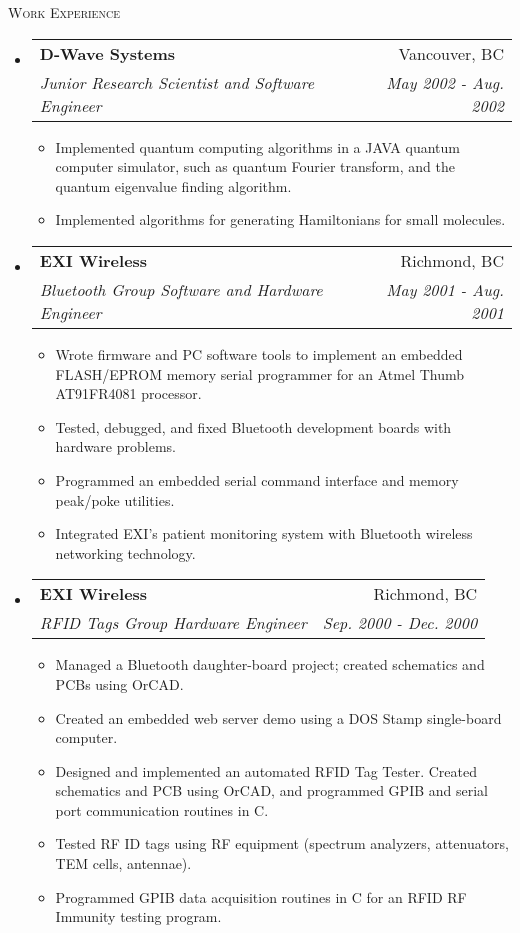 \documentclass[letterpaper,11pt]{article}
\makeatletter
\newcommand{\resitem}[1]{\item #1 \vspace{-2pt}}
\newcommand{\ressubheading}[4]{
\begin{tabular*}{6.5in}{l@{\extracolsep{\fill}}r}
		\textbf{#1} & #2 \\
		\textit{#3} & \textit{#4} \\
\end{tabular*}\vspace{-6pt}}
\makeatother
\begin{document}
\begin{tcolorbox}
\textsc{Work Experience}
\end{tcolorbox}
\begin{itemize}
\item
	\ressubheading{D-Wave Systems}{Vancouver, BC}{Junior Research Scientist and Software Engineer}{May 2002 - Aug. 2002}
	\begin{itemize}
		\resitem{Implemented quantum computing algorithms in a JAVA quantum computer simulator, such as quantum Fourier transform, and the quantum eigenvalue finding algorithm.}
		\resitem{Implemented algorithms for generating Hamiltonians for small molecules.}
	\end{itemize}

\item 
	\ressubheading{EXI Wireless}{Richmond, BC}{Bluetooth Group Software and Hardware Engineer}{May 2001 - Aug. 2001}
	\begin{itemize}
		\resitem{Wrote firmware and PC software tools to implement an embedded FLASH/EPROM memory serial programmer for an Atmel Thumb AT91FR4081 processor.}
		\resitem{Tested, debugged, and fixed Bluetooth development boards with hardware problems.}
		\resitem{Programmed an embedded serial command interface and memory peak/poke utilities.}
		\resitem{Integrated EXI's patient monitoring system with Bluetooth wireless networking technology.}
	\end{itemize}

\item
	\ressubheading{EXI Wireless}{Richmond, BC}{RFID Tags Group Hardware Engineer}{Sep. 2000 - Dec. 2000}
	\begin{itemize}
		\resitem{Managed a Bluetooth daughter-board project; created schematics and PCBs using OrCAD.}
		\resitem{Created an embedded web server demo using a DOS Stamp single-board computer.}
		\resitem{Designed and implemented an automated RFID Tag Tester.  Created schematics and PCB using OrCAD, and programmed GPIB and serial port communication routines in C.}
		\resitem{Tested RF ID tags using RF equipment (spectrum analyzers, attenuators, TEM cells, antennae).}
		\resitem{Programmed GPIB data acquisition routines in C for an RFID RF Immunity testing program.}
	\end{itemize}


\end{itemize}
\end{document}
